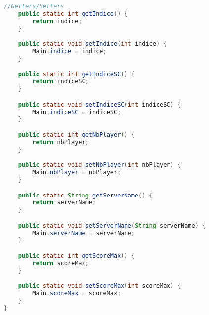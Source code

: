 \begin{lstlisting}[language=Java]
	//Getters/Setters
	public static int getIndice() {
		return indice;
	}

	public static void setIndice(int indice) {
		Main.indice = indice;
	}

	public static int getIndiceSC() {
		return indiceSC;
	}

	public static void setIndiceSC(int indiceSC) {
		Main.indiceSC = indiceSC;
	}

	public static int getNbPlayer() {
		return nbPlayer;
	}

	public static void setNbPlayer(int nbPlayer) {
		Main.nbPlayer = nbPlayer;
	}

	public static String getServerName() {
		return serverName;
	}

	public static void setServerName(String serverName) {
		Main.serverName = serverName;
	}

	public static int getScoreMax() {
		return scoreMax;
	}

	public static void setScoreMax(int scoreMax) {
		Main.scoreMax = scoreMax;
	}
}

\end{lstlisting}